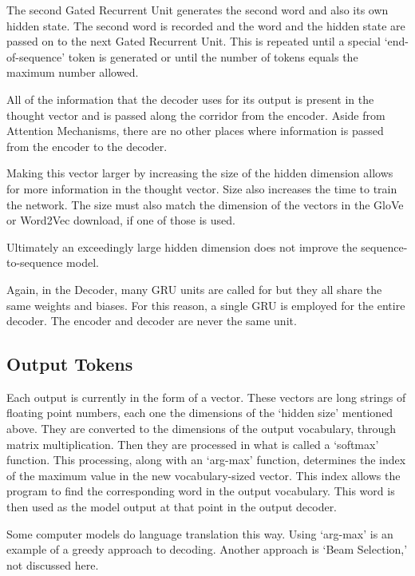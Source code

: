 The second Gated Recurrent Unit generates the second word and also its own hidden state. The second word is recorded and the word and the hidden state are passed on to the next Gated Recurrent Unit. This is repeated until a special `end-of-sequence' token is generated or until the number of tokens equals the maximum number allowed.



All of the information that the decoder uses for its output is present in the thought vector and is passed along the corridor from the encoder. %
Aside from Attention Mechanisms, there are no other places where information is passed from the encoder to the decoder.

Making this vector larger by increasing the size of the hidden dimension allows for more information in the thought vector. Size also increases the time to train the network. The size must also match the dimension of the vectors in the GloVe or Word2Vec download, if one of those is used. 

Ultimately an exceedingly large hidden dimension does not improve the sequence-to-sequence model.

Again, in the Decoder, many GRU units are called for but they all share the same weights and biases. For this reason, a single GRU is employed for the entire decoder. The encoder and decoder are never the same unit.

\subsection{Output Tokens}
Each output is currently in the form of a vector. These vectors are long strings of floating point numbers, each one the dimensions of the `hidden size' mentioned above. They are converted to the dimensions of the output vocabulary, through matrix multiplication. Then they are processed in what is called a `softmax' function. This processing, along with an `arg-max' function, determines the index of the maximum value in the new vocabulary-sized vector. This index allows the program to find the corresponding word in the output vocabulary. This word is then used as the model output at that point in the output decoder.

Some computer models do language translation this way. Using `arg-max' is an example of a greedy approach to decoding. Another approach is `Beam Selection,' not discussed here. 



